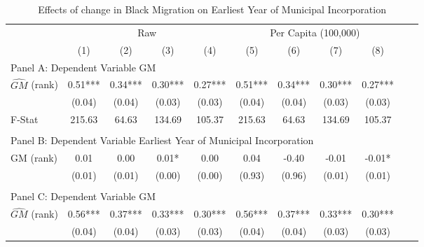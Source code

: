  \begin{table}[htbp]\centering {} \begin{threeparttable} \caption{Effects of change in Black Migration on Earliest Year of Municipal Incorporation} \begin{tabular}{l*{10}{c}} \toprule
                &\multicolumn{4}{c}{Raw}                                    &\multicolumn{4}{c}{Per Capita (100,000)}                   \\\cmidrule(lr){2-5}\cmidrule(lr){6-9}
                &\multicolumn{1}{c}{(1)}   &\multicolumn{1}{c}{(2)}   &\multicolumn{1}{c}{(3)}   &\multicolumn{1}{c}{(4)}   &\multicolumn{1}{c}{(5)}   &\multicolumn{1}{c}{(6)}   &\multicolumn{1}{c}{(7)}   &\multicolumn{1}{c}{(8)}   \\
\cmidrule(lr){1-9}
\multicolumn{8}{l}{Panel A: Dependent Variable GM}\\
\cmidrule(lr){1-9}
$\hat{GM}$ (rank)&       0.51***&       0.34***&       0.30***&       0.27***&       0.51***&       0.34***&       0.30***&       0.27***\\
                &     (0.04)   &     (0.04)   &     (0.03)   &     (0.03)   &     (0.04)   &     (0.04)   &     (0.03)   &     (0.03)   \\
\midrule
F-Stat          &     215.63   &      64.63   &     134.69   &     105.37   &     215.63   &      64.63   &     134.69   &     105.37   \\
\cmidrule[\heavyrulewidth](lr){1-9} \\ \cmidrule[\heavyrulewidth](lr){1-9}
\multicolumn{8}{l}{Panel B: Dependent Variable Earliest Year of Municipal Incorporation}\\
\cmidrule(lr){1-9}
GM  (rank)      &       0.01   &       0.00   &       0.01*  &       0.00   &       0.04   &      -0.40   &      -0.01   &      -0.01*  \\
                &     (0.01)   &     (0.01)   &     (0.00)   &     (0.00)   &     (0.93)   &     (0.96)   &     (0.01)   &     (0.01)   \\
\cmidrule[\heavyrulewidth](lr){1-9} \\ \cmidrule[\heavyrulewidth](lr){1-9}
\multicolumn{8}{l}{Panel C: Dependent Variable GM}\\
\cmidrule(lr){1-9}
$\hat{GM}$ (rank)&       0.56***&       0.37***&       0.33***&       0.30***&       0.56***&       0.37***&       0.33***&       0.30***\\
                &     (0.04)   &     (0.04)   &     (0.03)   &     (0.03)   &     (0.04)   &     (0.04)   &     (0.03)   &     (0.03)   \\

\end{tabular}
\end{threeparttable}
\end{table}
